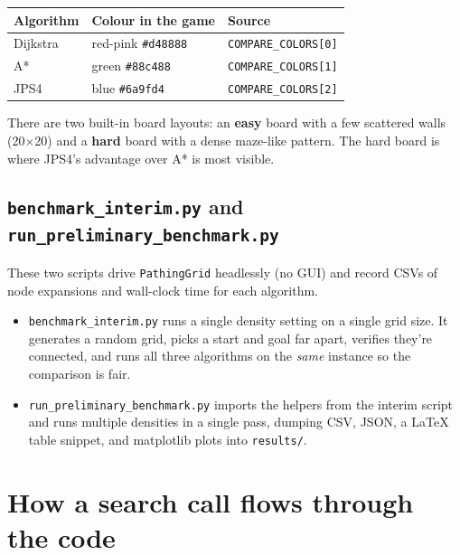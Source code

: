 \documentclass[11pt,a4paper]{article}
\begin{document}
\begin{center}
\renewcommand{\arraystretch}{1.2}
\begin{tabular}{@{}lll@{}}
\toprule
\textbf{Algorithm} & \textbf{Colour in the game} & \textbf{Source} \\
\midrule
Dijkstra & red-pink \texttt{\#d48888} & \texttt{COMPARE\_COLORS[0]} \\
A*       & green \texttt{\#88c488}    & \texttt{COMPARE\_COLORS[1]} \\
JPS4     & blue \texttt{\#6a9fd4}     & \texttt{COMPARE\_COLORS[2]} \\
\bottomrule
\end{tabular}
\end{center}

There are two built-in board layouts: an \textbf{easy} board with a few scattered walls (20$\times$20) and a \textbf{hard} board with a dense maze-like pattern. The hard board is where JPS4's advantage over A* is most visible.

\subsection{\texttt{benchmark\_interim.py} and \texttt{run\_preliminary\_benchmark.py}}

These two scripts drive \texttt{PathingGrid} headlessly (no GUI) and record CSVs of node expansions and wall-clock time for each algorithm.

\begin{itemize}[leftmargin=20pt,itemsep=2pt]
  \item \texttt{benchmark\_interim.py} runs a single density setting on a single grid size. It generates a random grid, picks a start and goal far apart, verifies they're connected, and runs all three algorithms on the \emph{same} instance so the comparison is fair.
  \item \texttt{run\_preliminary\_benchmark.py} imports the helpers from the interim script and runs multiple densities in a single pass, dumping CSV, JSON, a LaTeX table snippet, and matplotlib plots into \texttt{results/}.
\end{itemize}

\clearpage
\section{How a search call flows through the code}\label{sec:flow}
\end{document}
